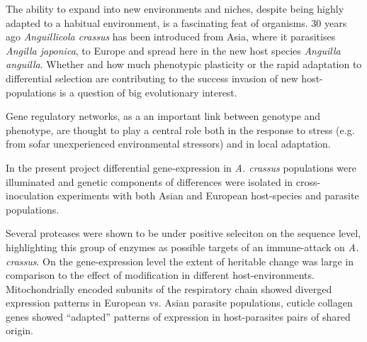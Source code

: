 


\begin{abstracts}        %

  The ability to expand into new environments and niches, despite
  being highly adapted to a habitual environment, is a fascinating
  feat of organisms. 30 years ago \textit{Anguillicola crassus} has
  been introduced from Asia, where it parasitises \textit{Angilla
    japonica}, to Europe and spread here in the new host species
  \textit{Anguilla anguilla}. Whether and how much phenotypic
  plasticity or the rapid adaptation to differential selection are
  contributing to the success invasion of new host-populations is a
  question of big evolutionary interest.

  Gene regulatory networks, as a an important link between genotype
  and phenotype, are thought to play a central role both in the
  response to stress (e.g. from sofar unexperienced environmental
  stressors) and in local adaptation.

  In the present project differential gene-expression in
  \textit{A. crassus} populations were illuminated and genetic
  components of differences were isolated in cross-inoculation
  experiments with both Asian and European host-species and parasite
  populations.

  Several proteases were shown to be under positive seleciton on the
  sequence level, highlighting this group of enzymes as possible
  targets of an immune-attack on \textit{A. crassus}. On the
  gene-expression level the extent of heritable change was large in
  comparison to the effect of modification in different
  host-environments. Mitochondrially encoded subunits of the
  respiratory chain showed diverged expression patterns in European
  vs. Asian parasite populations, cuticle collagen genes showed
  ``adapted'' patterns of expression in host-parasites pairs of shared
  origin.

\end{abstracts}



     
